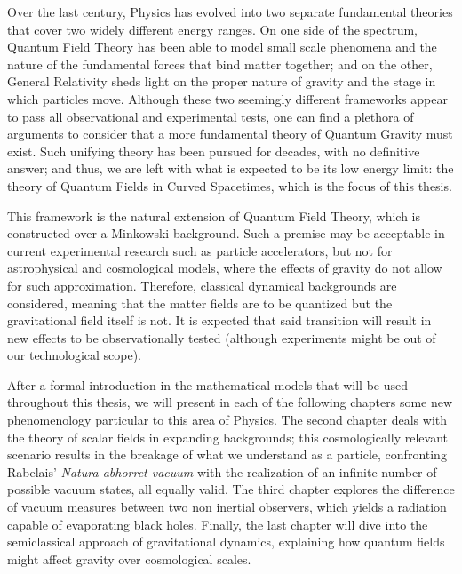 Over the last century, Physics has evolved into two separate fundamental theories that cover two widely different energy ranges. On one side of the spectrum, Quantum Field Theory has been able to model small scale phenomena and the nature of the fundamental forces that bind matter together; and on the other, General Relativity sheds light on the proper nature of gravity and the stage in which particles move. Although these two seemingly different frameworks appear to pass all observational and experimental tests, one can find a plethora of arguments to consider that a more fundamental theory of Quantum Gravity must exist. Such unifying theory has been pursued for decades, with no definitive answer; and thus, we are left with what is expected to be its low energy limit: the theory of Quantum Fields in Curved Spacetimes, which is the focus of this thesis.

\vspace*{0.4cm}
This framework is the natural extension of Quantum Field Theory, which is constructed over a Minkowski background. Such a premise may be acceptable in current experimental research such as particle accelerators, but not for astrophysical and cosmological models, where the effects of gravity do not allow for such approximation. Therefore, classical dynamical backgrounds are considered, meaning that the matter fields are to be quantized but the gravitational field itself is not. It is expected that said transition will result in new effects to be observationally tested (although experiments might be out of our technological scope).

\vspace*{0.5cm}
After a formal introduction in the mathematical models that will be used throughout this thesis, we will present in each of the following chapters some new phenomenology particular to this area of Physics. The second chapter deals with the theory of scalar fields in expanding backgrounds; this cosmologically relevant scenario results in the breakage of what we understand as a particle, confronting Rabelais' \textit{Natura abhorret vacuum} with the realization of an infinite number of possible vacuum states, all equally valid. The third chapter explores the difference of vacuum measures between two non inertial observers, which yields a radiation capable of evaporating black holes. Finally, the last chapter will dive into the semiclassical approach of gravitational dynamics, explaining how quantum fields might affect gravity over cosmological scales. 

\vspace*{0.5cm}
\begin{comment}
	This thesis aimed at graduate students of theoretical physics, was written as part of the requirements for the award of a masters degree on advance physics, and thus assumes some prior knowledge on both Quantum Field Theory and General relativity; although an appendix regarding the basis of a free quantum scalar field in a flat background was added as a piece of reference on the matter. For a more in depth reference on both fields, one might want to look into common bibliographies such as \cite{BiblioQFT} and \cite{BiblioGR}.
\end{comment}